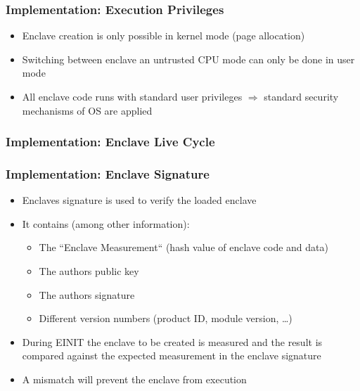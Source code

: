 \begin{frame}
    \frametitle{Implementation: Execution Privileges}
    \begin{itemize}[<+->]
        \item Enclave creation is only possible in kernel mode (page allocation)
        \item Switching between enclave an untrusted CPU mode can only be done in user mode
        \item All enclave code runs with standard user privileges \newline
              $\Rightarrow$ standard security mechanisms of OS are applied    
    \end{itemize}
\end{frame}

\begin{frame}
    \frametitle{Implementation: Enclave Live Cycle}
    \centering
\end{frame}

\begin{frame}
    \frametitle{Implementation: Enclave Signature}
    \label{fr:EncSig}
    \begin{itemize}[<+->]
        \item Enclaves signature is used to verify the loaded enclave
        \item It contains (among other information):
        \begin{itemize}
            \item The ``Enclave Measurement`` (hash value of enclave code and data)
            \item The authors public key
            \item The authors signature
            \item Different version numbers (product ID, module version, \dots)
        \end{itemize}
        \item During EINIT the enclave to be created is measured and the result is compared against the expected measurement in the enclave signature
        \item A mismatch will prevent the enclave from execution
    \end{itemize}
\end{frame}

\begin{frame}
    \frametitle{}

    

\end{frame}

